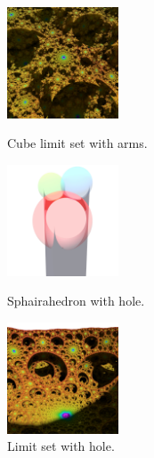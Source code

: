 \documentclass[suppldata, dvipdfmx]{interact}
\theoremstyle{plain}%
\theoremstyle{definition}
\theoremstyle{remark}
\theoremstyle{problemstyle}
\begin{document}
\begin{figure}[h!tbp]
 \begin{minipage}[t]{0.3\textwidth}
  \centering
  \includegraphics[width=1.3in, keepaspectratio]{./img/visualization/cubeArms.jpg}
 \caption{Cube limit set with arms.}
 \label{fig:cubeArms}
 \end{minipage}
 \hspace*{\fill}
 \begin{minipage}[t]{0.3\textwidth}
  \centering
  \includegraphics[width=1.3in,
  keepaspectratio]{./img/visualization/lowerHalfSphairahedron.jpg}
 \caption{Sphairahedron with hole.}
 \label{fig:lowerPrism}
 \end{minipage}
 \hspace*{\fill}
 \begin{minipage}[t]{0.3\textwidth}
  \centering
  \includegraphics[width=1.3in,
  keepaspectratio]{./img/visualization/lowerHalfLimit.jpg}
 \caption{Limit set with hole.}
 \label{fig:lowerLimit}
 \end{minipage}
 \hspace*{\fill}
\end{figure}
\end{document}

